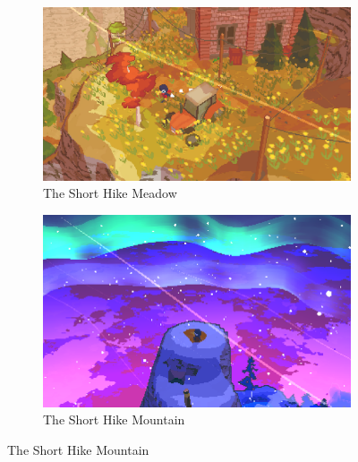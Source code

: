 \documentclass[a4paper,10pt,english]{article}
\begin{document}
\begin{figure}[h]

\centering

\begin{subfigure}{0.49\linewidth}
\includegraphics[width=1\linewidth]{TheShortHike1.png}
\caption{The Short Hike Meadow}
\label{fig:the short hike meadow}
\end{subfigure}\hfill
%
\begin{subfigure}{0.49\linewidth}
\includegraphics[width=1\linewidth]{TheShortHike2.png}
\caption{The Short Hike Mountain}
\label{fig:the short hike mountain}
\end{subfigure}\hfill

\end{figure}
\end{document}
